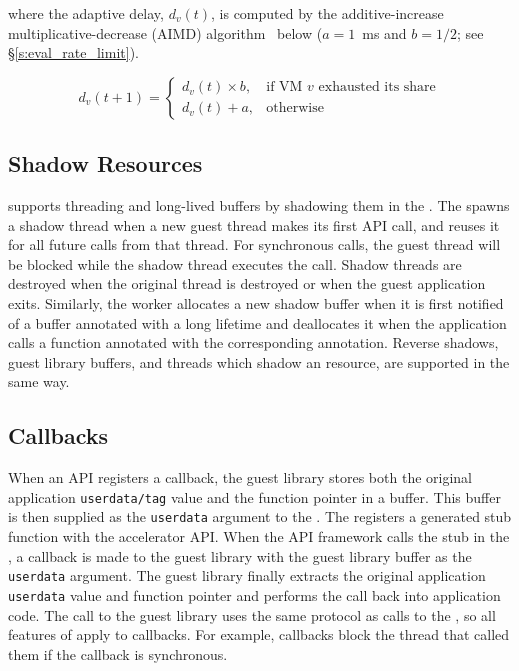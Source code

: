  where the adaptive delay, $d_v(t)$, is computed
by the additive-increase multiplicative-decrease (AIMD) algorithm~\cite{aimd}
below ($a=1$~ms and $b=1/2$; see \S\ref{s:eval_rate_limit}).

\[
d_v\left(t+1\right)=\begin{cases}
d_v\left(t\right)\times b, &\textrm{if VM $v$ exhausted its share}\\
d_v\left(t\right)+a, &\textrm{otherwise}
\end{cases}
\]

\subsection{Shadow Resources}

\AvA supports threading and long-lived buffers by shadowing them in the
\worker. The \worker spawns a shadow thread when a new guest thread makes its
first API call, and reuses it for all future calls from that thread. For
synchronous calls, the guest thread will be blocked while the shadow thread
executes the call. Shadow threads are destroyed when the original thread is
destroyed or when the guest application exits. Similarly, the worker allocates
a new shadow buffer when it is first notified of a buffer annotated with a
long lifetime and deallocates it when the application calls a function
annotated with the corresponding annotation. Reverse shadows, guest library
buffers, and threads which shadow an \worker resource, are supported in the
same way.

\subsection{Callbacks}

When an API registers a callback, the guest library stores both the original
application \texttt{userdata/tag} value and the function pointer in a buffer.
This buffer is then supplied as the \texttt{userdata} argument to the \worker.
The \worker registers a generated stub function with the accelerator API.
When the API framework calls the stub in the \worker, a callback is made to
the guest library with the guest library buffer as the \texttt{userdata}
argument. The guest library finally extracts the original application
\texttt{userdata} value and function pointer and performs the call back into
application code. The call to the guest library uses the same protocol as
calls to the \worker, so all features of \AvA apply to callbacks. For example,
callbacks block the \worker thread that called them if the callback is
synchronous.
